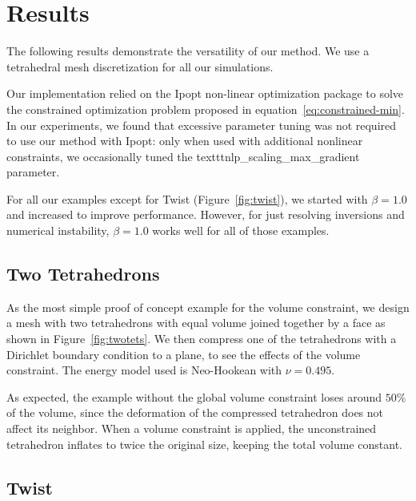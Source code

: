 \chapter{Results}
\label{ch:Results}

The following results demonstrate the versatility of our method. 
We use a tetrahedral mesh discretization for all our simulations.

Our implementation relied on the Ipopt non-linear optimization package \cite{Wachter:2006} to solve the constrained optimization problem proposed in equation~\eqref{eq:constrained-min}.
In our experiments, we found that excessive parameter tuning was not required to use our method with Ipopt: only when used with additional nonlinear constraints, we  occasionally tuned the texttt{nlp_scaling_max_gradient} parameter. 

For all our examples except for Twist (Figure~\ref{fig:twist}), we started with $\beta = 1.0$ and increased to improve performance.
However, for just resolving inversions and numerical instability, $\beta = 1.0$ works well for all of those examples.

\section{Two Tetrahedrons}

As the most simple proof of concept example for the volume constraint, we design a mesh with two
tetrahedrons with equal volume joined together by a face as shown in Figure~\ref{fig:twotets}. We
then compress one of the tetrahedrons with a Dirichlet boundary condition to a plane, to see the
effects of the volume constraint. The energy model used is Neo-Hookean with $\nu = 0.495$. 

As expected, the example without the global volume constraint loses around $50\%$ of the volume,
since the deformation of the compressed tetrahedron does not affect its neighbor.
When a volume constraint is applied, the unconstrained tetrahedron inflates to twice the original
size, keeping the total volume constant. 


\section{Twist}

